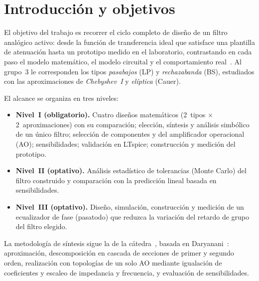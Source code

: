 \section{Introducción y objetivos}
\label{sec:introduccion}

El objetivo del trabajo es recorrer el ciclo completo de diseño de un filtro analógico activo: desde la función de transferencia
ideal que satisface una plantilla de atenuación hasta un prototipo medido en el laboratorio, contrastando en cada paso el modelo
matemático, el modelo circuital y el comportamiento real~\cite{guia2026}. Al grupo~3 le corresponden los tipos \emph{pasabajos}
(LP) y \emph{rechazabanda} (BS), estudiados con las aproximaciones de \emph{Chebyshev~I} y \emph{elíptica} (Cauer).

El alcance se organiza en tres niveles:
\begin{itemize}
  \item \textbf{Nivel~I (obligatorio).} Cuatro diseños matemáticos (2~tipos $\times$ 2~aproximaciones) con su comparación;
        elección, síntesis y análisis simbólico de un único filtro; selección de componentes y del amplificador operacional (AO);
        sensibilidades; validación en LTspice; construcción y medición del prototipo.
  \item \textbf{Nivel~II (optativo).} Análisis estadístico de tolerancias (Monte Carlo) del filtro construido y comparación
        con la predicción lineal basada en sensibilidades.
  \item \textbf{Nivel~III (optativo).} Diseño, simulación, construcción y medición de un ecualizador de fase (pasatodo) que
        reduzca la variación del retardo de grupo del filtro elegido.
\end{itemize}

La metodología de síntesis sigue la de la cátedra~\cite{apuntes2026}, basada en Daryanani~\cite{daryanani1976}:
aproximación, descomposición en cascada de secciones de primer y segundo orden, realización con topologías de un solo AO
mediante igualación de coeficientes y escaleo de impedancia y frecuencia, y evaluación de sensibilidades.
